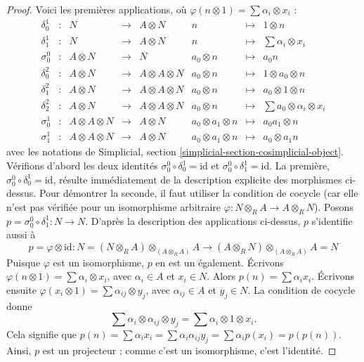 \begin{proof}
Voici les premières applications, où
$\varphi(n \otimes 1) = \sum \alpha_i \otimes x_i$ :
$$
\begin{matrix}
\delta^1_0 & : & N & \to & A \otimes N & n & \mapsto & 1 \otimes n \\
\delta^1_1 & : & N & \to & A \otimes N & n & \mapsto &
\sum \alpha_i \otimes x_i\\
\sigma^0_0 & : & A \otimes N & \to & N & a_0 \otimes n & \mapsto & a_0n \\
\delta^2_0 & : & A \otimes N & \to & A \otimes A \otimes N &
a_0 \otimes n & \mapsto & 1 \otimes a_0 \otimes n \\
\delta^2_1 & : & A \otimes N & \to & A \otimes A \otimes N &
a_0 \otimes n & \mapsto & a_0 \otimes 1 \otimes n \\
\delta^2_2 & : & A \otimes N & \to & A \otimes A \otimes N &
a_0 \otimes n & \mapsto & \sum a_0 \otimes \alpha_i \otimes x_i \\
\sigma^1_0 & : & A \otimes A \otimes N & \to & A \otimes N &
a_0 \otimes a_1 \otimes n & \mapsto & a_0a_1 \otimes n \\
\sigma^1_1 & : & A \otimes A \otimes N & \to & A \otimes N &
a_0 \otimes a_1 \otimes n & \mapsto & a_0 \otimes a_1n
\end{matrix}
$$
avec les notations de
Simplicial, section \ref{simplicial-section-cosimplicial-object}.
Vérifions d'abord les deux identités $\sigma^0_0 \circ \delta^1_0 = \text{id}$
et $\sigma^0_0 \circ \delta^1_1 = \text{id}$.
La première, $\sigma^0_0 \circ \delta^1_0 = \text{id}$, résulte immédiatement
de la description explicite des morphismes ci-dessus.
Pour démontrer la seconde, il faut utiliser la condition de cocycle
(car elle n'est pas vérifiée pour un isomorphisme arbitraire
$\varphi : N \otimes_R A \to A \otimes_R N$). Posons
$p = \sigma^0_0 \circ \delta^1_1 : N \to N$. D'après la description
des applications ci-dessus, $p$ s'identifie aussi à
$$
p = \varphi \otimes \text{id} :
N = (N \otimes_R A) \otimes_{(A \otimes_R A)} A
\longrightarrow
(A \otimes_R N) \otimes_{(A \otimes_R A)} A = N
$$
Puisque $\varphi$ est un isomorphisme, $p$ en est un également.
Écrivons $\varphi(n \otimes 1) = \sum \alpha_i \otimes x_i$, avec
$\alpha_i \in A$ et $x_i \in N$. Alors $p(n) = \sum \alpha_ix_i$.
Écrivons ensuite
$\varphi(x_i \otimes 1) = \sum \alpha_{ij} \otimes y_j$, avec
$\alpha_{ij} \in A$ et $y_j \in N$. La condition de cocycle donne
$$
\sum \alpha_i \otimes \alpha_{ij} \otimes y_j
=
\sum \alpha_i \otimes 1 \otimes x_i.
$$
Cela signifie que $p(n) = \sum \alpha_ix_i = \sum \alpha_i\alpha_{ij}y_j =
\sum \alpha_i p(x_i) = p(p(n))$. Ainsi, $p$ est un projecteur ; comme
c'est un isomorphisme, c'est l'identité.


\end{proof}
